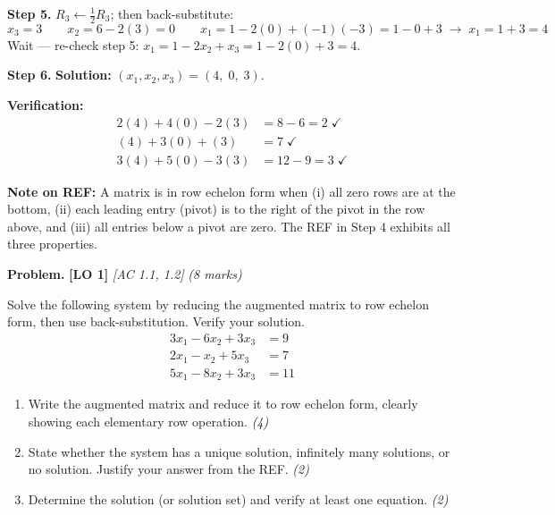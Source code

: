 \documentclass[12pt,a4paper]{article}
\newcommand{\lo}[1]{\textcolor{locolor}{\textbf{[LO #1]}}}
\newcommand{\ac}[1]{\textcolor{locolor}{\textit{[AC #1]}}}
\newcommand{\step}[1]{\noindent\textbf{Step #1.}\;}
\begin{document}
\begin{tcolorbox}[worked]
		\step{5} $R_3 \leftarrow \tfrac{1}{2}R_3$; then back-substitute:
		\[
		x_3 = 3 \qquad
		x_2 = 6 - 2(3) = 0 \qquad
		x_1 = 1 - 2(0) + (-1)(-3) = 1 - 0 + 3 \;\to\; x_1 = 1 + 3 = 4
		\]
		Wait — re-check step 5:
		$x_1 = 1 - 2x_2 + x_3 = 1 - 2(0) + 3 = 4$.
		
		\step{6} \textbf{Solution:} $\displaystyle(x_1, x_2, x_3) = (4,\; 0,\; 3)$.
		
		\textbf{Verification:}
		\begin{align*}
			2(4)+4(0)-2(3) &= 8-6 = 2\;\checkmark \\
			(4)+3(0)+(3)   &= 7\;\checkmark \\
			3(4)+5(0)-3(3) &= 12-9 = 3\;\checkmark
		\end{align*}
		
		\textbf{Note on REF:} A matrix is in row echelon form when (i) all zero rows are at the bottom,
		(ii) each leading entry (pivot) is to the right of the pivot in the row above, and
		(iii) all entries below a pivot are zero. The REF in Step 4 exhibits all three properties.
	\end{tcolorbox}
	
	\begin{tcolorbox}[practice]
		\textbf{Problem.} \lo{1} \ac{1.1, 1.2} \hfill \textit{(8 marks)}
		
		Solve the following system by reducing the augmented matrix to row echelon form, then use
		back-substitution. Verify your solution.
		\[
		\begin{aligned}
			3x_1 - 6x_2 + 3x_3 &= 9 \\
			2x_1 -  x_2 + 5x_3 &= 7 \\
			5x_1 - 8x_2 + 3x_3 &= 11
		\end{aligned}
		\]
		\begin{enumerate}[label=(\alph*)]
			\item Write the augmented matrix and reduce it to row echelon form, clearly showing each elementary row operation. \hfill\textit{(4)}
			\item State whether the system has a unique solution, infinitely many solutions, or no solution. Justify your answer from the REF. \hfill\textit{(2)}
			\item Determine the solution (or solution set) and verify at least one equation. \hfill\textit{(2)}
		\end{enumerate}
	\end{tcolorbox}
	
	\begin{tcolorbox}[answer]
	\end{tcolorbox}
	
\end{document}
